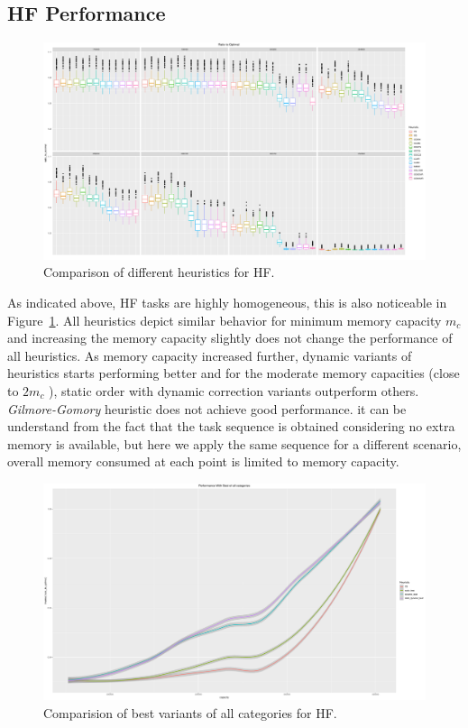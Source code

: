 \documentclass[sigconf]{acmart}
\begin{document}
\subsection{HF Performance}	
\begin{figure}[htb]
	\includegraphics[scale=0.25]{./results/plots/ratio_to_optimal_selected_hf.pdf}
	\caption{Comparison of different heuristics for HF.}
	\label{fig:ratio_to_optimal_hf}
\end{figure}
As indicated above, HF tasks are highly homogeneous, this is also noticeable in Figure~\ref{fig:ratio_to_optimal_hf}. All heuristics depict similar behavior for minimum memory capacity $m_c$  and  increasing the memory capacity slightly does not change the performance of all heuristics. As memory capacity increased further, dynamic variants of heuristics starts performing better and for the moderate memory capacities (close to $2m_c$ ), static order with dynamic correction variants outperform others. \textit{Gilmore-Gomory} heuristic does not achieve good performance. it can be understand from the fact that the task sequence is obtained considering no extra memory is available, but here we apply the same sequence for a different scenario,  overall memory consumed at each point is limited to memory capacity.


\begin{figure}[htb]
	\includegraphics[scale=0.15]{./results/plots/inverse_ratio_to_optimal_hf-best.pdf}
	\caption{Comparision of best variants of all categories for HF.}
	\label{fig:ratio_to_optimal_best_hf}
\end{figure}
\end{document}
